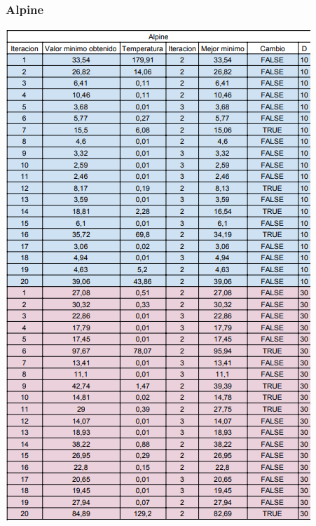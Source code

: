 \documentclass[10pt]{article}
\begin{document}
\subsubsection{Alpine}
\begin{center}
  \includegraphics[scale=0.5]{imgs/alpine.png}
\end{center}
\end{document}
